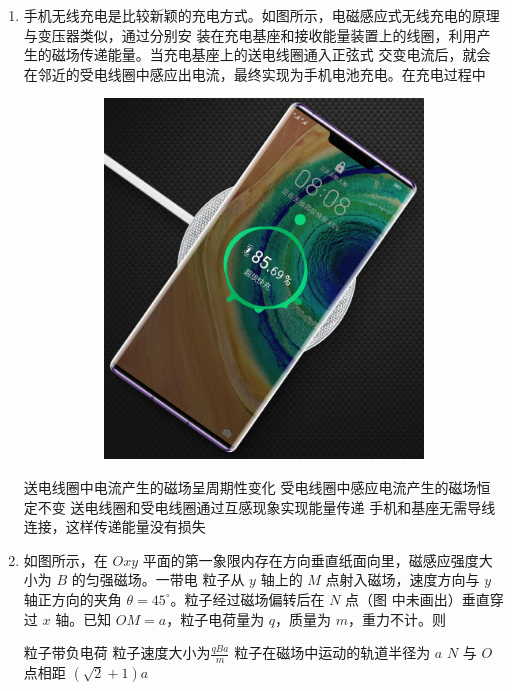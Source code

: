 \begin{enumerate}
\item
手机无线充电是比较新颖的充电方式。如图所示，电磁感应式无线充电的原理与变压器类似，通过分别安
装在充电基座和接收能量装置上的线圈，利用产生的磁场传递能量。当充电基座上的送电线圈通入正弦式
交变电流后，就会在邻近的受电线圈中感应出电流，最终实现为手机电池充电。在充电过程中  
\begin{figure}[h!]
\centering
\begin{subfigure}{0.4\linewidth}
\centering
\includegraphics[width=0.3\linewidth]{picture/screenshot054}
\caption{}\label{}
\end{subfigure}
\begin{subfigure}{0.4\linewidth}
\centering
 
\caption{}\label{}
\end{subfigure}
\end{figure}


\fourchoices
{送电线圈中电流产生的磁场呈周期性变化}
{受电线圈中感应电流产生的磁场恒定不变}
{送电线圈和受电线圈通过互感现象实现能量传递}
{手机和基座无需导线连接，这样传递能量没有损失}





\item
如图所示，在 $ Oxy $ 平面的第一象限内存在方向垂直纸面向里，磁感应强度大小为 $ B $ 的匀强磁场。一带电
粒子从 $ y $ 轴上的 $ M $ 点射入磁场，速度方向与 $ y $ 轴正方向的夹角 $ \theta=45 ^{ \circ } $。粒子经过磁场偏转后在 $ N $ 点（图
中未画出）垂直穿过 $ x $ 轴。已知 $ OM=a $，粒子电荷量为 $ q $，质量为 $ m $，重力不计。则  
\begin{figure}[h!]
\centering

\end{figure}


\fourchoices
{粒子带负电荷}
{粒子速度大小为$\frac{q B a}{m}$}
{粒子在磁场中运动的轨道半径为 $ a $}
{$ N $ 与 $ O $ 点相距 $ (\sqrt{2}+1)a $}



\end{enumerate}
